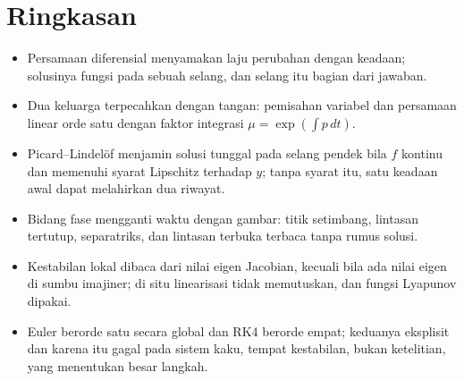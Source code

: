 \section{Ringkasan}
\begin{ringkasan}
\begin{itemize}
\item Persamaan diferensial menyamakan laju perubahan dengan keadaan; solusinya
fungsi pada sebuah selang, dan selang itu bagian dari jawaban.
\item Dua keluarga terpecahkan dengan tangan: pemisahan variabel dan persamaan
linear orde satu dengan faktor integrasi $\mu=\exp(\int p\,dt)$.
\item Picard--Lindel\"of menjamin solusi tunggal pada selang pendek bila $f$
kontinu dan memenuhi syarat Lipschitz terhadap $y$; tanpa syarat itu, satu
keadaan awal dapat melahirkan dua riwayat.
\item Bidang fase mengganti waktu dengan gambar: titik setimbang, lintasan
tertutup, separatriks, dan lintasan terbuka terbaca tanpa rumus solusi.
\item Kestabilan lokal dibaca dari nilai eigen Jacobian, kecuali bila ada nilai
eigen di sumbu imajiner; di situ linearisasi tidak memutuskan, dan fungsi
Lyapunov dipakai.
\item Euler berorde satu secara global dan RK4 berorde empat; keduanya eksplisit
dan karena itu gagal pada sistem kaku, tempat kestabilan, bukan ketelitian,
yang menentukan besar langkah.
\end{itemize}
\end{ringkasan}

